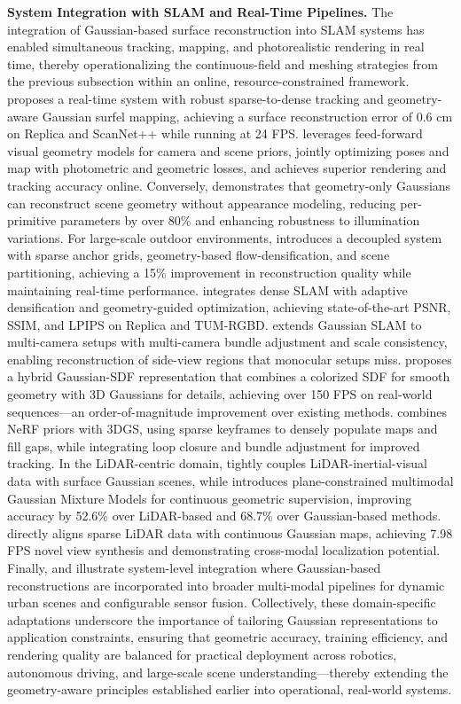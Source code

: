\documentclass[11pt]{article}
\begin{document}
\textbf{System Integration with SLAM and Real-Time Pipelines.} The integration of Gaussian-based surface reconstruction into SLAM systems has enabled simultaneous tracking, mapping, and photorealistic rendering in real time, thereby operationalizing the continuous-field and meshing strategies from the previous subsection within an online, resource-constrained framework. \cite{ref242} proposes a real-time system with robust sparse-to-dense tracking and geometry-aware Gaussian surfel mapping, achieving a surface reconstruction error of 0.6 cm on Replica and ScanNet++ while running at 24 FPS. \cite{ref243} leverages feed-forward visual geometry models for camera and scene priors, jointly optimizing poses and map with photometric and geometric losses, and achieves superior rendering and tracking accuracy online. Conversely, \cite{ref244} demonstrates that geometry-only Gaussians can reconstruct scene geometry without appearance modeling, reducing per-primitive parameters by over 80\% and enhancing robustness to illumination variations. For large-scale outdoor environments, \cite{ref245} introduces a decoupled system with sparse anchor grids, geometry-based flow-densification, and scene partitioning, achieving a 15\% improvement in reconstruction quality while maintaining real-time performance. \cite{ref246} integrates dense SLAM with adaptive densification and geometry-guided optimization, achieving state-of-the-art PSNR, SSIM, and LPIPS on Replica and TUM-RGBD. \cite{ref247} extends Gaussian SLAM to multi-camera setups with multi-camera bundle adjustment and scale consistency, enabling reconstruction of side-view regions that monocular setups miss. \cite{ref248} proposes a hybrid Gaussian-SDF representation that combines a colorized SDF for smooth geometry with 3D Gaussians for details, achieving over 150 FPS on real-world sequences---an order-of-magnitude improvement over existing methods. \cite{ref249} combines NeRF priors with 3DGS, using sparse keyframes to densely populate maps and fill gaps, while integrating loop closure and bundle adjustment for improved tracking. In the LiDAR-centric domain, \cite{ref250} tightly couples LiDAR-inertial-visual data with surface Gaussian scenes, while \cite{ref251} introduces plane-constrained multimodal Gaussian Mixture Models for continuous geometric supervision, improving accuracy by 52.6\% over LiDAR-based and 68.7\% over Gaussian-based methods. \cite{ref252} directly aligns sparse LiDAR data with continuous Gaussian maps, achieving 7.98 FPS novel view synthesis and demonstrating cross-modal localization potential. Finally, \cite{ref253} and \cite{ref254} illustrate system-level integration where Gaussian-based reconstructions are incorporated into broader multi-modal pipelines for dynamic urban scenes and configurable sensor fusion. Collectively, these domain-specific adaptations underscore the importance of tailoring Gaussian representations to application constraints, ensuring that geometric accuracy, training efficiency, and rendering quality are balanced for practical deployment across robotics, autonomous driving, and large-scale scene understanding---thereby extending the geometry-aware principles established earlier into operational, real-world systems.
\end{document}
